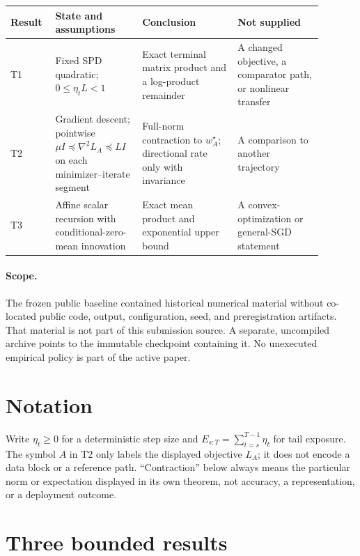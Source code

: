 \documentclass{article}
\begin{document}
\begin{center}
\small
\begin{tabular}{p{0.12\linewidth}|p{0.23\linewidth}|p{0.29\linewidth}|p{0.25\linewidth}}
\textbf{Result} & \textbf{State and assumptions} & \textbf{Conclusion} & \textbf{Not supplied} \\
\hline
T1 & Fixed SPD quadratic; $0\leq\eta_tL<1$ & Exact terminal matrix product and a log-product remainder & A changed objective, a comparator path, or nonlinear transfer \\
T2 & Gradient descent; pointwise $\mu I\preceq\nabla^2L_A\preceq LI$ on each minimizer--iterate segment & Full-norm contraction to $w_A^\star$; directional rate only with invariance & A comparison to another trajectory \\
T3 & Affine scalar recursion with conditional-zero-mean innovation & Exact mean product and exponential upper bound & A convex-optimization or general-SGD statement
\end{tabular}
\end{center}

\paragraph{Scope.}
The frozen public baseline contained historical numerical material without
co-located public code, output, configuration, seed, and preregistration
artifacts. That material is not part of this submission source. A separate,
uncompiled archive points to the immutable checkpoint containing it. No
unexecuted empirical policy is part of the active paper.

\section{Notation}
\label{sec:setup}

Write $\eta_t\geq0$ for a deterministic step size and
$E_{s:T}=\sum_{t=s}^{T-1}\eta_t$ for tail exposure. The symbol $A$ in T2
only labels the displayed objective $L_A$; it does not encode a data block or
a reference path. ``Contraction'' below always means the
particular norm or expectation displayed in its own theorem, not accuracy, a
representation, or a deployment outcome.

\section{Three bounded results}
\label{sec:theory}
\end{document}
